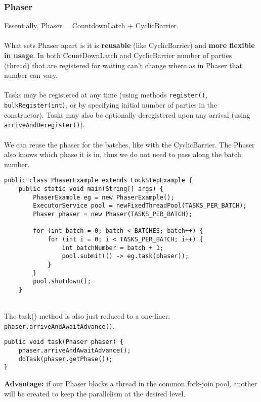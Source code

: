 \documentclass[a4paper]{article}
\begin{document}
\subsubsection{Phaser}
Essentially, Phaser = CountdownLatch + CyclicBarrier.\\
\\
What sets Phaser apart is it is \textbf{reusable} (like CyclicBarrier) and \textbf{more flexible in usage}. In both CountDownLatch and CyclicBarrier number of parties (thread) that are registered for waiting can't change where as in Phaser that number can vary.\\
\\
Tasks may be registered at any time (using methods \texttt{register()},  \texttt{bulkRegister(int)}, or by specifying initial number of parties in the constructor). Tasks may also be optionally deregistered upon any arrival (using \texttt{arriveAndDeregister()}).\\
\\
We can reuse the phaser for the batches, like with the CyclicBarrier. The Phaser also knows which phase it is in, thus we do not need to pass along the batch number.
\begin{verbatim}
public class PhaserExample extends LockStepExample {
	public static void main(String[] args) {
		PhaserExample eg = new PhaserExample();
		ExecutorService pool = newFixedThreadPool(TASKS_PER_BATCH);
		Phaser phaser = new Phaser(TASKS_PER_BATCH);

		for (int batch = 0; batch < BATCHES; batch++) {
			for (int i = 0; i < TASKS_PER_BATCH; i++) {
				int batchNumber = batch + 1;
				pool.submit(() -> eg.task(phaser));
			}
		}
		pool.shutdown();
	}
\end{verbatim}
\mbox{}\\
The task() method is also just reduced to a one-liner: \texttt{phaser.arriveAndAwaitAdvance()}.
\begin{verbatim}
public void task(Phaser phaser) {
	phaser.arriveAndAwaitAdvance();
	doTask(phaser.getPhase());
}
\end{verbatim}
\textbf{Advantage:} if our Phaser blocks a thread in the common fork-join pool, another will be created to keep the parallelism at the desired level.
\newpage
\end{document}
